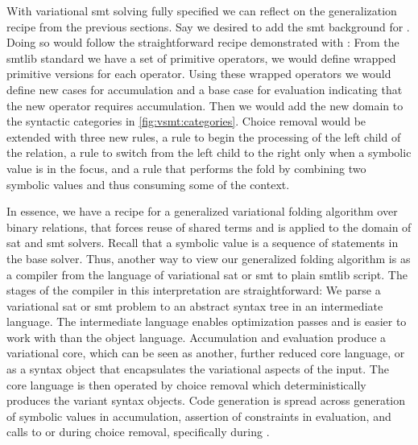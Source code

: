 \label{section:vsmt:arrays}
%
With variational \ac{smt} solving fully specified we can reflect on the
generalization recipe from the previous sections. Say we desired to add the
\ac{smt} background for . Doing so would follow the straightforward
recipe demonstrated with : From the \acl{smtlib} standard we have a set
of primitive operators, we would define wrapped primitive versions for each
operator. Using these wrapped operators we would define new cases for
accumulation and a base case for evaluation indicating that the new operator
requires accumulation. Then we would add the new domain to the syntactic
categories in \autoref{fig:vsmt:categories}. Choice removal would be extended
with three new rules, a rule to begin the processing of the left child of the
relation, a rule to switch from the left child to the right only when a symbolic
value is in the focus, and a rule that performs the fold by combining two
symbolic values and thus consuming some of the context.

In essence, we have a recipe for a generalized variational folding algorithm
over binary relations, that forces reuse of shared terms and is applied to the
domain of \ac{sat} and \ac{smt} solvers. Recall that a symbolic value is a
sequence of statements in the base solver. Thus, another way to view our
generalized folding algorithm is as a compiler from the language of variational
\ac{sat} or \ac{smt} to plain \acl{smtlib} script. The stages of the compiler in
this interpretation are straightforward: We parse a variational \ac{sat} or
\ac{smt} problem to an abstract syntax tree in an intermediate language. The
intermediate language enables optimization passes and is easier to work with
than the object language. Accumulation and evaluation produce a variational
core, which can be seen as another, further reduced core language, or as a
syntax object that encapsulates the variational aspects of the input. The core
language is then operated by choice removal which deterministically produces the
variant syntax objects. Code generation is spread across generation of symbolic
values in accumulation, assertion of constraints in evaluation, and calls to
 or  during choice removal, specifically during \crChc.

